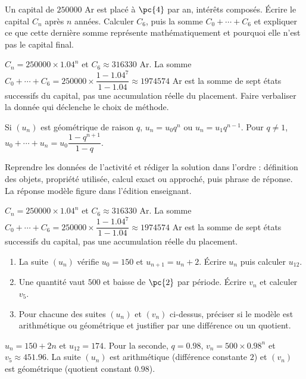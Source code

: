 \begin{activity}
Un capital de $\num{250000}$ Ar est placé à $\pc{4}$ par an, intérêts composés. Écrire le capital $C_n$ après $n$ années. Calculer $C_6$, puis la somme $C_0+\cdots+C_6$ et expliquer ce que cette dernière somme représente mathématiquement et pourquoi elle n'est pas le capital final.

\end{activity}
\begin{solution}$C_n=\num{250000}\times\num{1,04}^n$ et $C_6\approx\num{316330}$ Ar. La somme $C_0+\cdots+C_6=\num{250000}\times\dfrac{1-\num{1,04}^7}{1-\num{1,04}}\approx\num{1974574}$ Ar est la somme de sept états successifs du capital, pas une accumulation réelle du placement. Faire verbaliser la donnée qui déclenche le choix de méthode.\end{solution}

\begin{summary}Si $(u_n)$ est géométrique de raison $q$, $u_n=u_0q^n$ ou $u_n=u_1q^{n-1}$. Pour $q\neq1$, $u_0+\cdots+u_n=u_0\dfrac{1-q^{n+1}}{1-q}$.\end{summary}

\begin{example}
Reprendre les données de l'activité et rédiger la solution dans l'ordre : définition des objets, propriété utilisée, calcul exact ou approché, puis phrase de réponse. La réponse modèle figure dans l'édition enseignant.
\end{example}
\begin{solution}$C_n=\num{250000}\times\num{1,04}^n$ et $C_6\approx\num{316330}$ Ar. La somme $C_0+\cdots+C_6=\num{250000}\times\dfrac{1-\num{1,04}^7}{1-\num{1,04}}\approx\num{1974574}$ Ar est la somme de sept états successifs du capital, pas une accumulation réelle du placement.\end{solution}

\begin{exercise}[essentiel]
\begin{enumerate}\item La suite $(u_n)$ vérifie $u_0=150$ et $u_{n+1}=u_n+2$. Écrire $u_n$ puis calculer $u_{12}$.\item Une quantité vaut $500$ et baisse de $\pc{2}$ par période. Écrire $v_n$ et calculer $v_5$.\item Pour chacune des suites $(u_n)$ et $(v_n)$ ci-dessus, préciser si le modèle est arithmétique ou géométrique et justifier par une différence ou un quotient.\end{enumerate}
\end{exercise}
\begin{solution}$u_n=150+2n$ et $u_{12}=174$. Pour la seconde, $q=\num{0,98}$, $v_n=500\times\num{0,98}^n$ et $v_5\approx\num{451,96}$. La suite $(u_n)$ est arithmétique (différence constante $2$) et $(v_n)$ est géométrique (quotient constant $\num{0,98}$).\end{solution}

